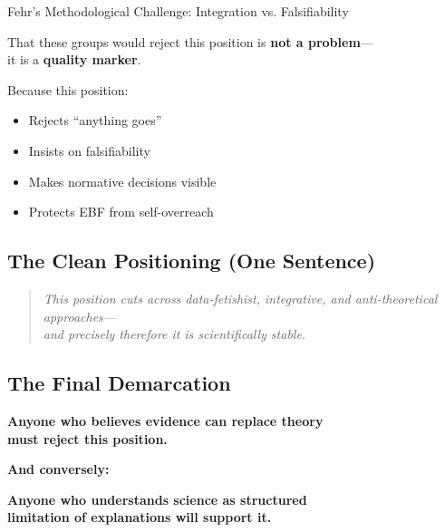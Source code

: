 \begin{chapter}{Fehr's Methodological Challenge: Integration vs. Falsifiability}
\begin{tcolorbox}[colback=blue!5!white,colframe=blue!75!black,title=\textbf{The Key Insight}]
That these groups would reject this position is \textbf{not a problem}---\\
it is a \textbf{quality marker}.

\medskip
Because this position:
\begin{itemize}[noitemsep]
    \item Rejects ``anything goes''
    \item Insists on falsifiability
    \item Makes normative decisions visible
    \item Protects EBF from self-overreach
\end{itemize}
\end{tcolorbox}

\subsection{The Clean Positioning (One Sentence)}

\begin{quote}
\textit{This position cuts across data-fetishist, integrative, and anti-theoretical approaches---\\
and precisely therefore it is scientifically stable.}
\end{quote}

\subsection{The Final Demarcation}

\begin{tcolorbox}[colback=red!10!white,colframe=red!75!black,title=\textbf{The Demarcation Criterion}]
\begin{center}
\large
\textbf{Anyone who believes evidence can replace theory\\
must reject this position.}

\vspace{0.5em}
\textbf{And conversely:}

\textbf{Anyone who understands science as structured\\
limitation of explanations will support it.}
\end{center}
\end{tcolorbox}



\end{chapter}
